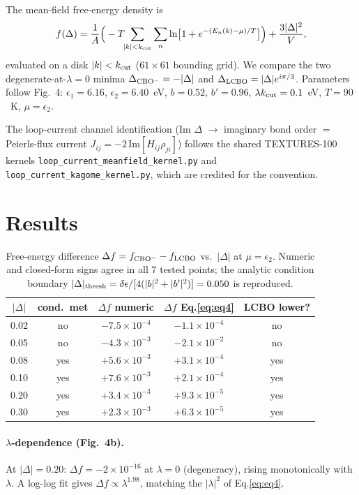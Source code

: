 \documentclass[11pt]{article}
\begin{document}
The mean-field free-energy density is
\begin{equation}
f(\Delta)=\frac{1}{A}\Big(-T\!\!\sum_{|k|<k_{\rm cut}}\sum_n
\ln\!\big[1+e^{-(E_n(k)-\mu)/T}\big]\Big)+\frac{3|\Delta|^2}{V},
\end{equation}
evaluated on a disk $|k|<k_{\rm cut}$ ($61\times61$ bounding grid). We compare the
two degenerate-at-$\lambda{=}0$ minima $\Delta_{\rm CBO^-}=-|\Delta|$ and
$\Delta_{\rm LCBO}=|\Delta|e^{i\pi/3}$. Parameters follow Fig.~4:
$\epsilon_1=6.16$, $\epsilon_2=6.40$~eV, $b=0.52$, $b'=0.96$, $\lambda
k_{\rm cut}=0.1$~eV, $T=90$~K, $\mu=\epsilon_2$.

The loop-current channel identification (Im $\Delta$ $\to$ imaginary bond order
$= $ Peierls-flux current $J_{ij}=-2\,\mathrm{Im}[H_{ij}\rho_{ji}]$) follows the
shared TEXTURES-100 kernels
\texttt{loop\_current\_meanfield\_kernel.py} and
\texttt{loop\_current\_kagome\_kernel.py}, which are credited for the convention.

\section{Results}
\begin{table}[h]\centering
\begin{tabular}{ccccc}
\toprule
$|\Delta|$ & cond.\ met & $\Delta f$ numeric & $\Delta f$ Eq.\eqref{eq:eq4} & LCBO lower? \\
\midrule
0.02 & no  & $-7.5\times10^{-4}$ & $-1.1\times10^{-4}$ & no  \\
0.05 & no  & $-4.3\times10^{-3}$ & $-2.1\times10^{-2}$ & no  \\
0.08 & yes & $+5.6\times10^{-3}$ & $+3.1\times10^{-4}$ & yes \\
0.10 & yes & $+7.6\times10^{-3}$ & $+2.1\times10^{-4}$ & yes \\
0.20 & yes & $+3.4\times10^{-3}$ & $+9.3\times10^{-5}$ & yes \\
0.30 & yes & $+2.3\times10^{-3}$ & $+6.3\times10^{-5}$ & yes \\
\bottomrule
\end{tabular}
\caption{Free-energy difference $\Delta f=f_{\rm CBO^-}-f_{\rm LCBO}$ vs.\
$|\Delta|$ at $\mu=\epsilon_2$. Numeric and closed-form signs agree in all $7$
tested points; the analytic condition boundary $|\Delta|_{\rm thresh}=\delta\epsilon/[4(|b|^2+|b'|^2)]=0.050$ is reproduced.}
\end{table}

\paragraph{$\lambda$-dependence (Fig.~4b).} At $|\Delta|=0.20$: $\Delta f=-2\times10^{-16}$
at $\lambda=0$ (degeneracy), rising monotonically with $\lambda$. A log-log fit
gives $\Delta f\propto\lambda^{1.98}$, matching the $|\lambda|^2$ of
Eq.\eqref{eq:eq4}.
\end{document}
